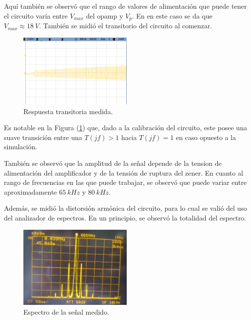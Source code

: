 Aquí también se observó que el rango de valores de alimentación que puede tener el circuito varía entre $V_{max}$ del opamp y $V_p$. En en este caso se da que $V_{max}\approx 18 \ V$. También se midió el transitorio del circuito al comenzar.
\begin{figure}[H]
	\centering
	\includegraphics[width=0.5\textwidth]{Imagenes-Ej1/osciladorstep.png}
	\caption{Respuesta transitoria medida.}
	\label{fig:transStep}
\end{figure}

Es notable en la Figura (\ref{fig:transStep}) que, dado a la calibración del circuito, este posee una suave transición entre una $T(jf)>1$ hacia $T(jf) = 1$ en caso opuesto a la simulación.

También se observó que la amplitud de la señal depende de la tension de alimentación del amplificador y de la tensión de ruptura del zener. En cuanto al rango de frecuencias en las que puede trabajar, se observó que puede variar entre aproximadamente $65 \ kHz$ y $80 \ kHz$.

Además, se midió la distorsión armónica del circuito, para lo cual se valió del uso del analizador de espectros. En un principio, se observó la totalidad del espectro.
\begin{figure}[H]
	\centering
	\includegraphics[width=0.5\textwidth]{Imagenes-Ej1/Espectro.jpeg}
	\caption{Espectro de la señal medido.}
	\label{fig:Espectro}
\end{figure}

